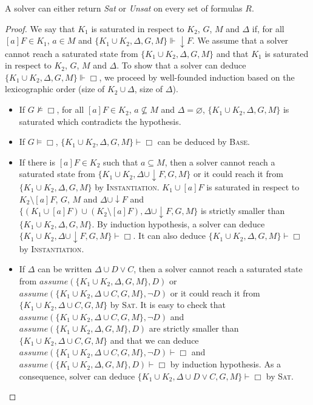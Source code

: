 \documentclass[a4paper,11pt]{article}
\newcommand{\A}{\mathit{assume}}
\begin{document}
{\theorem\label{comp} A solver can either return \emph{Sat} or \emph{Unsat} on every set of formulas $R$.}
\begin{proof}
We say that $K_1$ is saturated in respect to $K_2$, $G$, $M$ and $\Delta$ if, for all $[a]F\in K_1$,
$a\in M$ and $\{K_1\cup K_2,\Delta,G,M\}\Vdash\downarrow F$.
We assume that a solver cannot reach a saturated state from
$\{K_1\cup K_2,\Delta,G,M\}$ and that $K_1$ is saturated in respect to $K_2$, $G$, $M$ and $\Delta$.
To show that a solver can deduce $\{K_1\cup K_2,\Delta,G,M\}\Vdash\Box$,
we proceed by well-founded induction based on the lexicographic order (size of $K_2\cup \Delta$,
size of $\Delta$).
\begin{itemize}
 \item If $G\nvDash\Box$, for all $[a]F\in K_2$, $a\nsubseteq M$ and $\Delta=\varnothing$,
$\{K_1\cup K_2,\Delta,G,M\}$ is saturated which contradicts the hypothesis.
 \item If $G\vDash\Box$, $\{K_1\cup K_2,\Delta,G,M\}\vdash\Box$ can be deduced by \textsc{Base}.
 \item If there is $[a]F\in K_2$ such that $a\subseteq M$, then a solver
cannot reach a saturated state from $\{K_1\cup K_2,\Delta\cup\downarrow F,G,M\}$ or it could
reach it from $\{K_1\cup K_2,\Delta,G,M\}$ by \textsc{Instantiation}.
$K_1\cup [a]F$ is saturated in respect to $K_2\setminus[a]F$, $G$, $M$ and $\Delta\cup\downarrow F$
and $\{(K_1\cup [a]F)\cup(K_2\setminus[a]F),\Delta\cup\downarrow F,G,M\}$ is strictly smaller than
$\{K_1\cup K_2,\Delta,G,M\}$. By induction hypothesis,
a solver can deduce $\{K_1\cup K_2,\Delta\cup\downarrow F,G,M\}\vdash\Box$.
It can also deduce $\{K_1\cup K_2,\Delta,G,M\}\vdash\Box$ by \textsc{Instantiation}.
 \item If $\Delta$ can be written $\Delta\cup D\vee C$, then a solver
cannot reach a saturated state from $\A(\{K_1\cup K_2,\Delta,G,M\},D)$ or
$\A(\{K_1\cup K_2,\Delta\cup C,G,M\},\neg D)$ or it could
reach it from $\{K_1\cup K_2,\Delta\cup C,G,M\}$ by \textsc{Sat}.
It is easy to check that $\A(\{K_1\cup K_2,\Delta\cup C,G,M\},\neg D)$ and
$\A(\{K_1\cup K_2,\Delta,G,M\},D)$ are strictly smaller than $\{K_1\cup K_2,\Delta\cup C,G,M\}$
and that we can deduce $\A(\{K_1\cup K_2,\Delta\cup C,G,M\},\neg D)\vdash\Box$ and
$\A(\{K_1\cup K_2,\Delta,G,M\},D)\vdash\Box$ by induction hypothesis.
As a consequence, solver can deduce $\{K_1\cup K_2,\Delta\cup D\vee C,G,M\}\vdash\Box$ by \textsc{Sat}.
\end{itemize}
\end{proof}
\end{document}
